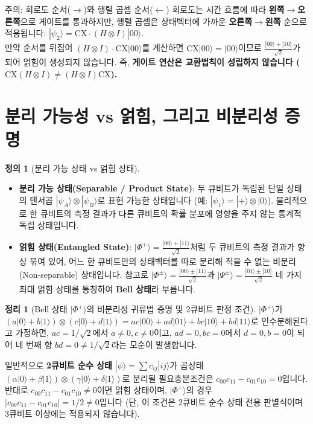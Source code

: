 \documentclass[11pt, a4paper]{article}
\newcommand{\ket}[1]{|#1\rangle}
\theoremstyle{definition}
\newtheorem{definition}{정의}[section]
\newtheorem{theorem}{정리}[section]
\begin{document}
\begin{cautionbox}{주의: 회로도 순서($\to$)와 행렬 곱셈 순서($\leftarrow$)}
회로도는 시간 흐름에 따라 \textbf{왼쪽$\to$오른쪽}으로 게이트를 통과하지만, 행렬 곱셈은 상태벡터에 가까운 \textbf{오른쪽$\to$왼쪽} 순으로 적용됩니다: $\ket{\psi_2} = \mathrm{CX} \cdot (H \otimes I)\ket{00}$.\\
만약 순서를 뒤집어 $(H \otimes I) \cdot \mathrm{CX}\ket{00}$를 계산하면 $\mathrm{CX}\ket{00} = \ket{00}$이므로 $\frac{\ket{00}+\ket{10}}{\sqrt{2}}$가 되어 얽힘이 생성되지 않습니다. 즉, \textbf{게이트 연산은 교환법칙이 성립하지 않습니다 ($\mathrm{CX}(H \otimes I) \neq (H \otimes I)\mathrm{CX}$).}
\end{cautionbox}

\section{분리 가능성 vs 얽힘, 그리고 비분리성 증명}
\begin{definition}[분리 가능 상태 vs 얽힘 상태]
\begin{itemize}
    \item \textbf{분리 가능 상태(Separable / Product State)}: 두 큐비트가 독립된 단일 상태의 텐서곱 $\ket{\psi_A} \otimes \ket{\psi_B}$로 표현 가능한 상태입니다 (예: $\ket{\psi_1} = \ket{+}\otimes\ket{0}$). 물리적으로 한 큐비트의 측정 결과가 다른 큐비트의 확률 분포에 영향을 주지 않는 통계적 독립 상태입니다.
    \item \textbf{얽힘 상태(Entangled State)}: $\ket{\Phi^+} = \frac{\ket{00}+\ket{11}}{\sqrt{2}}$처럼 두 큐비트의 측정 결과가 항상 묶여 있어, 어느 한 큐비트만의 상태벡터를 따로 분리해 적을 수 없는 비분리(Non-separable) 상태입니다. 참고로 $\ket{\Phi^\pm} = \frac{\ket{00}\pm\ket{11}}{\sqrt{2}}$과 $\ket{\Psi^\pm} = \frac{\ket{01}\pm\ket{10}}{\sqrt{2}}$ 네 가지 최대 얽힘 상태를 통칭하여 \textbf{Bell 상태}라 부릅니다.
\end{itemize}
\end{definition}

\begin{theorem}[Bell 상태 $\ket{\Phi^+}$의 비분리성 귀류법 증명 및 2큐비트 판정 조건]
$\ket{\Phi^+}$가 $(a\ket{0}+b\ket{1}) \otimes (c\ket{0}+d\ket{1}) = ac\ket{00}+ad\ket{01}+bc\ket{10}+bd\ket{11}$로 인수분해된다고 가정하면, $ac = 1/\sqrt{2}$에서 $a \neq 0, c \neq 0$이고, $ad = 0, bc = 0$에서 $d=0, b=0$이 되어 네 번째 항 $bd = 0 \neq 1/\sqrt{2}$라는 모순이 발생합니다.

일반적으로 \textbf{2큐비트 순수 상태} $\ket{\psi} = \sum c_{ij}\ket{ij}$가 곱상태 $(\alpha\ket{0}+\beta\ket{1})\otimes(\gamma\ket{0}+\delta\ket{1})$로 분리될 필요충분조건은 $c_{00}c_{11} - c_{01}c_{10} = 0$입니다. 반대로 $c_{00}c_{11} - c_{01}c_{10} \neq 0$이면 얽힘 상태이며, $\ket{\Phi^+}$의 경우 $|c_{00}c_{11} - c_{01}c_{10}| = 1/2 \neq 0$입니다 (단, 이 조건은 2큐비트 순수 상태 전용 판별식이며 3큐비트 이상에는 적용되지 않습니다).
\end{theorem}
\end{document}
